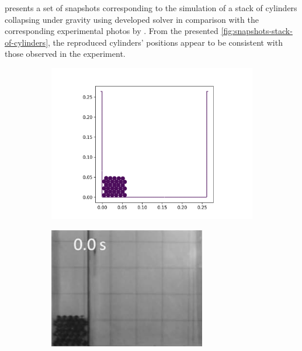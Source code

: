  presents a set of snapshots
corresponding to the simulation of a stack of cylinders collapsing under gravity
using developed solver in comparison with the corresponding experimental photos
by \citep{zhang_simulation_2009}. From the presented
\cref{fig:snapshots-stack-of-cylinders}, the reproduced cylinders' positions
appear to be consistent with those observed in the experiment.
\begin{figure}[!htpb]
  \centering
  \begin{subfigure}{0.48\textwidth}
    \centering
    \includegraphics[width=1.0\textwidth]{figures/rfc/figures/stack_of_cylinders_2d/Mohseni_Vyas/time0}
  \end{subfigure}
  \begin{subfigure}{0.48\textwidth}
    \centering
    \includegraphics[width=0.75\textwidth]{images/rfc/images/stack_of_cylinders_experimental_images/time0}
  \end{subfigure}


\end{figure}
